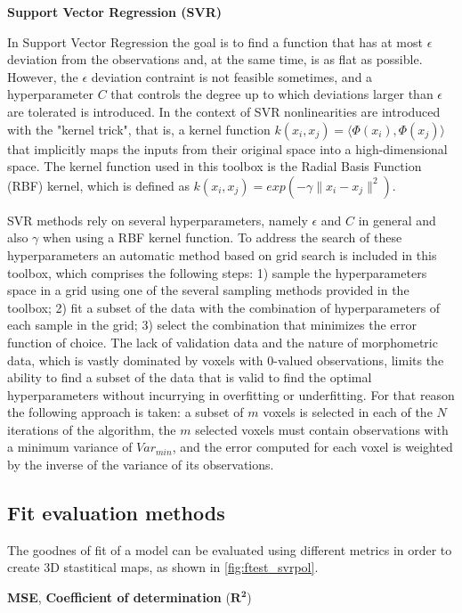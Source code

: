 \documentclass{article}
\begin{document}
\textbf{Support Vector Regression (SVR)} 

In Support Vector Regression the goal is to find a function that has at most $\epsilon$ deviation from the observations and, at the same time, is as flat as possible. However, the $\epsilon$ deviation contraint is not feasible sometimes, and a hyperparameter $C$ that controls the degree up to which deviations larger than $\epsilon$ are tolerated is introduced. 
In the context of SVR nonlinearities are introduced with the "kernel trick", that is, a kernel function $ k(x_i, x_j) = \langle \Phi(x_i), \Phi(x_j) \rangle $ that implicitly maps the inputs from their original space into a high-dimensional space. The kernel function used in this toolbox is the Radial Basis Function (RBF) kernel, which is defined as $ k(x_i, x_j) = exp(-\gamma \|x_i - x_j\|^2)$.

SVR methods rely on several hyperparameters, namely $\epsilon$ and $C$ in general and also $\gamma$ when using a RBF kernel function. To address the search of these hyperparameters an automatic method based on grid search is included in this toolbox, which comprises the following steps: 1) sample the hyperparameters space in a grid using one of the several sampling methods provided in the toolbox; 2) fit a subset of the data with the combination of hyperparameters of each sample in the grid; 3) select the combination that minimizes the error function of choice. 
The lack of validation data and the nature of morphometric data, which is vastly dominated by voxels with 0-valued observations, limits the ability to find a subset of the data that is valid to find the optimal hyperparameters without incurrying in overfitting or underfitting. For that reason the following approach is taken: a subset of $m$ voxels is selected in each of the $N$ iterations of the algorithm, the $m$ selected voxels must contain observations with a minimum variance of $Var_{min}$, and the error computed for each voxel is weighted by the inverse of the variance of its observations. 

\subsection{Fit evaluation methods}

The goodnes of fit of a model can be evaluated using different metrics in order to create 3D stastitical maps, as shown in \autoref{fig:ftest_svrpol}.
		
\textbf{MSE}, \textbf{Coefficient of determination} ($\mathbf{R^2}$)
\end{document}
